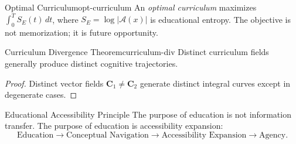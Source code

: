 \begin{definition}{Optimal Curriculum}{opt-curriculum}
  An \emph{optimal curriculum} maximizes
  $\int_0^T S_E(t)\,dt$,
  where $S_E = \log |\mathcal{A}(x)|$ is educational entropy.
  The objective is not memorization; it is future opportunity.
\end{definition}

\begin{theorem}{Curriculum Divergence Theorem}{curriculum-div}
  Distinct curriculum fields generally produce distinct cognitive
  trajectories.
\end{theorem}
\begin{proof}
  Distinct vector fields $\mathbf{C}_1 \neq \mathbf{C}_2$ generate
  distinct integral curves except in degenerate cases.
\end{proof}

\begin{namedthm}{Educational Accessibility Principle}
  The purpose of education is not information transfer. The purpose of
  education is accessibility expansion:
  \[
    \text{Education} \to \text{Conceptual Navigation}
    \to \text{Accessibility Expansion} \to \text{Agency.}
  \]
\end{namedthm}
